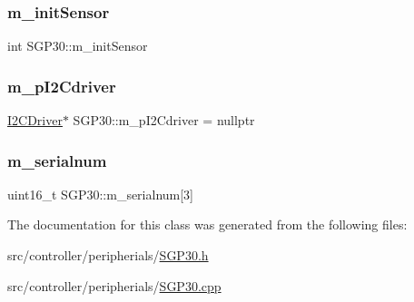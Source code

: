 \subsubsection{\texorpdfstring{m\+\_\+init\+Sensor}{m\_initSensor}}
{\footnotesize\ttfamily int S\+G\+P30\+::m\+\_\+init\+Sensor\hspace{0.3cm}{\ttfamily [private]}}

\mbox{\label{classSGP30_a3be2d504b90a81a66af2bcd4fc96673b}} 
\subsubsection{\texorpdfstring{m\+\_\+p\+I2\+Cdriver}{m\_pI2Cdriver}}
{\footnotesize\ttfamily \hyperlink{classI2CDriver}{I2\+C\+Driver}$\ast$ S\+G\+P30\+::m\+\_\+p\+I2\+Cdriver = nullptr\hspace{0.3cm}{\ttfamily [private]}}

\mbox{\label{classSGP30_a6da04f39b302756d806d36ff3aa93293}} 
\subsubsection{\texorpdfstring{m\+\_\+serialnum}{m\_serialnum}}
{\footnotesize\ttfamily uint16\+\_\+t S\+G\+P30\+::m\+\_\+serialnum\mbox{[}3\mbox{]}\hspace{0.3cm}{\ttfamily [private]}}



The documentation for this class was generated from the following files\+:\begin{DoxyCompactItemize}
\item 
src/controller/peripherials/\hyperlink{SGP30_8h}{S\+G\+P30.\+h}\item 
src/controller/peripherials/\hyperlink{SGP30_8cpp}{S\+G\+P30.\+cpp}\end{DoxyCompactItemize}
